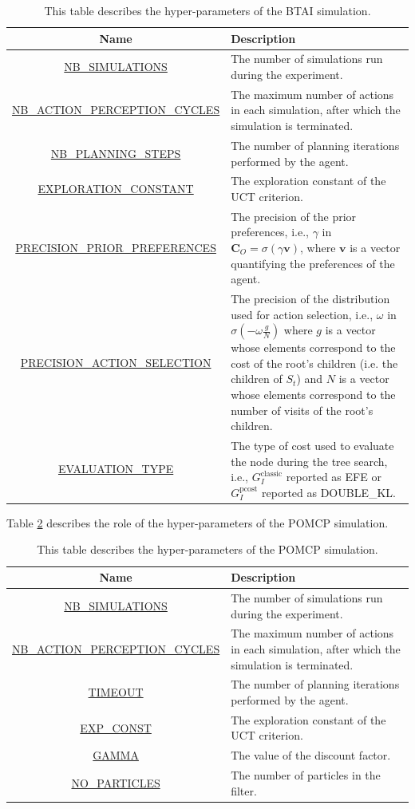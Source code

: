 \documentclass[twoside,11pt]{article}
\begin{document}
\begin{table}[H]
\centering
\begin{tabular}{ |c|p{12cm}|  }
 \hline
 Name & Description\\
 \hline
 \hline
 \url{NB_SIMULATIONS} & The number of simulations run during the experiment.\\
 \hline
 \url{NB_ACTION_PERCEPTION_CYCLES} & The maximum number of actions in each simulation, after which the simulation is terminated.\\
 \hline
 \url{NB_PLANNING_STEPS} & The number of planning iterations performed by the agent.\\
 \hline
 \url{EXPLORATION_CONSTANT} & The exploration constant of the UCT criterion.\\
 \hline
 \url{PRECISION_PRIOR_PREFERENCES} & The precision of the prior preferences, i.e., $\gamma$ in $\bm{C}_O = \sigma(\gamma \bm{v})$, where $\bm{v}$ is a vector quantifying the preferences of the agent.\\
 \hline
 \url{PRECISION_ACTION_SELECTION} & The precision of the distribution used for action selection, i.e., $\omega$ in $\sigma(-\omega \frac{g}{N})$ where $g$ is a vector whose elements correspond to the cost of the root's children (i.e. the children of $S_t$) and $N$ is a vector whose elements correspond to the number of visits of the root's children.\\
 \hline
 \url{EVALUATION_TYPE} & The type of cost used to evaluate the node during the tree search, i.e., $G^{\text{classic}}_I$ reported as EFE or $G^{\text{pcost}}_I$ reported as DOUBLE\_KL.\\
 \hline
\end{tabular}
\caption{This table describes the hyper-parameters of the BTAI simulation.}
\label{tab:hyper_param_descr}
\end{table}

Table \ref{tab:POMCP_hyper_param_descr} describes the role of the hyper-parameters of the POMCP simulation.

\begin{table}[H]
\centering
\begin{tabular}{ |c|p{12cm}|  }
 \hline
 Name & Description\\
 \hline
 \hline
 \url{NB_SIMULATIONS} & The number of simulations run during the experiment.\\
 \hline
 \url{NB_ACTION_PERCEPTION_CYCLES} & The maximum number of actions in each simulation, after which the simulation is terminated.\\
 \hline
 \url{TIMEOUT} & The number of planning iterations performed by the agent.\\
 \hline
 \url{EXP_CONST} & The exploration constant of the UCT criterion.\\
 \hline
 \url{GAMMA} & The value of the discount factor.\\
 \hline
 \url{NO_PARTICLES} & The number of particles in the filter.\\
 \hline
\end{tabular}
\caption{This table describes the hyper-parameters of the POMCP simulation.}
\label{tab:POMCP_hyper_param_descr}
\end{table}
\end{document}
